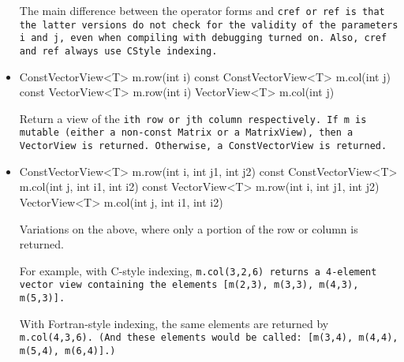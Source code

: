 \begin{itemize}
The main difference between the operator forms and \tt{cref} or \tt{ref} is that the latter versions do not
check for the validity of the parameters \tt{i} and \tt{j}, even when compiling with debugging turned on.
Also, \tt{cref} and \tt{ref} always use \tt{CStyle} indexing.

\item
\begin{tmvcode}
ConstVectorView<T> m.row(int i) const
ConstVectorView<T> m.col(int j) const
VectorView<T> m.row(int i)
VectorView<T> m.col(int j)
\end{tmvcode}
Return a view of the \tt{i}th row or \tt{j}th column respectively.
If \tt{m} is mutable (either a non-\tt{const Matrix} or a \tt{MatrixView}),
then a \tt{VectorView} is returned.  Otherwise, a \tt{ConstVectorView}
is returned.

\item
\begin{tmvcode}
ConstVectorView<T> m.row(int i, int j1, int j2) const
ConstVectorView<T> m.col(int j, int i1, int i2) const
VectorView<T> m.row(int i, int j1, int j2)
VectorView<T> m.col(int j, int i1, int i2) 
\end{tmvcode}
Variations on the above, where only a portion of the row or column
is returned.  

For example, with C-style indexing, \tt{m.col(3,2,6)} returns a 4-element
vector view containing the elements
[\tt{m(2,3), m(3,3), m(4,3), m(5,3)}].

With Fortran-style indexing, the same elements are returned by \tt{m.col(4,3,6)}. 
(And these elements would be called: [\tt{m(3,4), m(4,4), m(5,4), m(6,4)}].)


\end{itemize}
